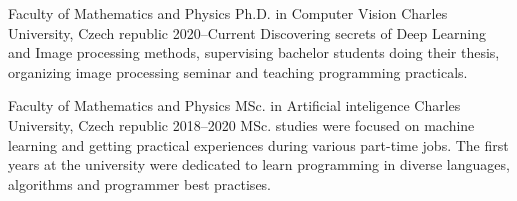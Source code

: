 

\begin{cventries}

    \cventry
    {Faculty of Mathematics and Physics} %
    {Ph.D. in Computer Vision} %
    {Charles University, Czech republic} %
    {2020--Current} %
    {
    Discovering secrets of Deep Learning and Image processing methods, supervising bachelor students doing their thesis,  organizing image processing seminar and teaching programming practicals. 
    }
  
  \cventry
    {Faculty of Mathematics and Physics} %
    {MSc. in Artificial inteligence} %
    {Charles University, Czech republic} %
    {2018--2020} %
    {
    MSc. studies were focused on machine learning and getting practical experiences during various part-time jobs. The first years at the university were dedicated to learn programming in diverse languages, algorithms and programmer best practises.  
    }
    
\end{cventries}
